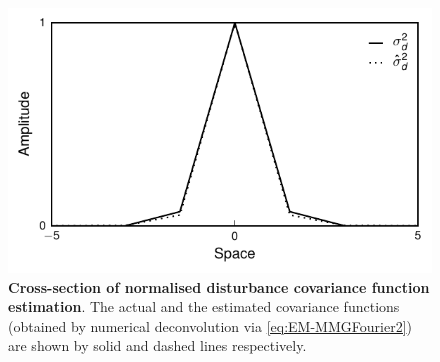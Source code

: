 \documentclass[]{article}
\begin{document}
\begin{figure}[!ht]
\begin{center}
\centering
\includegraphics[scale=1]{./Figures/DisturbanceWidthEstimationCrossSection.pdf}
\end{center}
\caption{{\bf Cross-section of normalised disturbance covariance function estimation}. The actual and the estimated covariance functions (obtained by numerical deconvolution via \eqref{eq:EM-MMGFourier2}) are shown by solid and dashed lines respectively.}
\label{fig:DisturbanceWidthEstimationCrossSection}
\end{figure}
\end{document}
